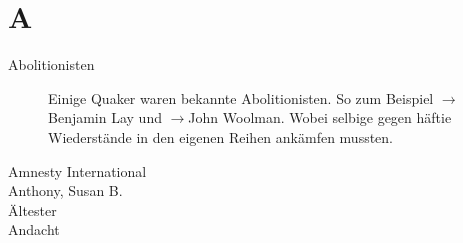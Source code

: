 \section*{A}

\articlesize
\begin{description}

 \item[Abolitionisten] Einige Quaker waren bekannte Abolitionisten. So zum Beispiel $\to$Benjamin Lay und $\to$John Woolman. Wobei selbige gegen häftie Wiederstände in den eigenen Reihen ankämfen mussten.

 \item[Amnesty International]

 \item[Anthony, Susan B.]

 \item[Ältester]

 \item[Andacht]

 \end{description}
\normalsize
